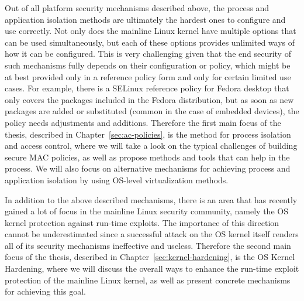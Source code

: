 Out of all platform security mechanisms described above, the process and application isolation methods are ultimately the hardest ones to configure and use correctly. Not only does the mainline Linux kernel have multiple options that can be used simultaneously, but each of these options provides unlimited ways of how it can be configured. This is very challenging given that the end security of such mechanisms fully depends on their configuration or policy, which might be at best provided only in a reference policy form and only for certain limited use cases. For example, there is a SELinux reference policy for Fedora desktop that only covers the packages included in the Fedora distribution, but as soon as new packages are added or substituted (common in the case of embedded devices), the policy needs adjustments and additions. Therefore the first main focus of the thesis, described in Chapter~\ref{sec:ac-policies}, is the method for process isolation and access control, where we will take a look on the typical challenges of building secure MAC policies, as well as propose methods and tools that can help in the process. We will also focus on alternative mechanisms for achieving process and application isolation by using OS-level virtualization methods. 

In addition to the above described mechanisms, there is an area that has recently gained a lot of focus in the mainline Linux security community, namely the OS kernel protection against run-time exploits. The importance of this direction cannot be underestimated since a successful attack on the OS kernel itself renders all of its security mechanisms ineffective and useless. Therefore the second main focus of the thesis, described in Chapter~\ref{sec:kernel-hardening}, is the OS Kernel Hardening, where we will discuss the overall ways to enhance the run-time exploit protection of the mainline Linux kernel, as well as present concrete mechanisms for achieving this goal. 
 